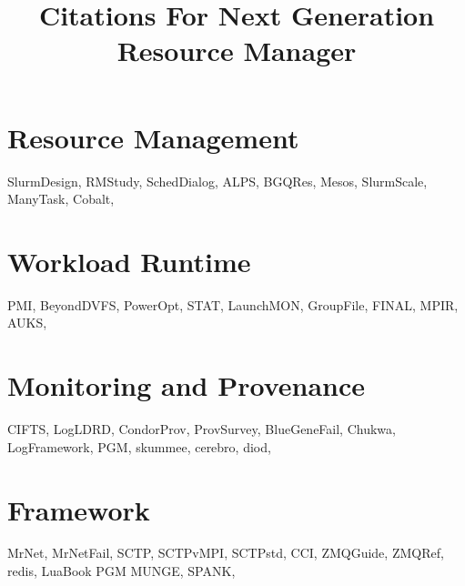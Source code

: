 \documentclass{article}
\newcommand{\ngrmfull}{Next Generation Resource Manager}
\begin{document}
\title{Citations For \ngrmfull}
\maketitle

\section{Resource Management}

SlurmDesign\cite{SlurmDesign},
RMStudy\cite{RMStudy},
SchedDialog\cite{SchedDialog},
ALPS\cite{ALPS},
BGQRes\cite{BGQRes},
Mesos\cite{Mesos},
SlurmScale\cite{SlurmScale},
ManyTask\cite{ManyTask},
Cobalt\cite{Cobalt},

\section{Workload Runtime}

PMI\cite{PMI},
BeyondDVFS\cite{BeyondDVFS},
PowerOpt\cite{PowerOpt},
STAT\cite{STAT},
LaunchMON\cite{LaunchMON},
GroupFile\cite{GroupFile},
FINAL\cite{FINAL},
MPIR\cite{MPIR},
AUKS\cite{AUKS},

\section{Monitoring and Provenance}

CIFTS\cite{CIFTS},
LogLDRD\cite{LogLDRD},
CondorProv\cite{CondorProv},
ProvSurvey\cite{ProvSurvey},
BlueGeneFail\cite{BlueGeneFail},
Chukwa\cite{Chukwa},
LogFramework\cite{LogFramework},
PGM\cite{rfc3208},
skummee\cite{skummee},
cerebro\cite{cerebro},
diod\cite{diod},

\section{Framework}

MrNet\cite{MrNet},
MrNetFail\cite{MrNetFail},
SCTP\cite{SCTP},
SCTPvMPI\cite{SCTPvMPI},
SCTPstd\cite{SCTPstd},
CCI\cite{CCI},
ZMQGuide\cite{ZMQGuide},
ZMQRef\cite{ZMQRef},
redis\cite{redis},
LuaBook\cite{LuaBook}
PGM\cite{rfc3208}
MUNGE\cite{munge},
SPANK\cite{SPANK},



\end{document}
